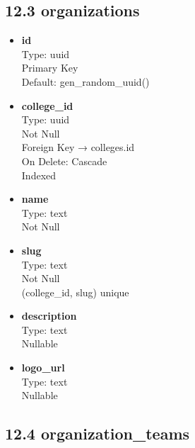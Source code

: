 \documentclass[12pt]{article}
\begin{document}
\subsection*{12.3 organizations}

\begin{itemize}
    \item \textbf{id} \\
    Type: uuid \\
    Primary Key \\
    Default: gen\_random\_uuid()

    \item \textbf{college\_id} \\
    Type: uuid \\
    Not Null \\
    Foreign Key → colleges.id \\
    On Delete: Cascade \\
    Indexed

    \item \textbf{name} \\
    Type: text \\
    Not Null

    \item \textbf{slug} \\
    Type: text \\
    Not Null \\
    (college\_id, slug) unique

    \item \textbf{description} \\
    Type: text \\
    Nullable

    \item \textbf{logo\_url} \\
    Type: text \\
    Nullable
\end{itemize}

\subsection*{12.4 organization\_teams}
\end{document}
